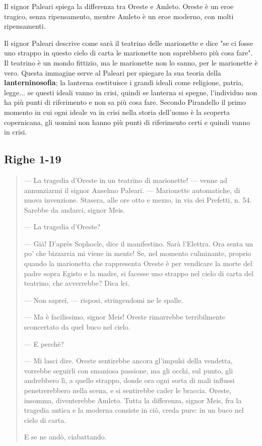 \documentclass[a4paper, twoside, titlepage]{book}
\newcounter{mar}
\begin{document}
Il signor Paleari spiega la differenza tra Oreste e Amleto. Oreste è un eroe tragico, senza ripensamento, mentre Amleto è un eroe moderno, con molti ripensamenti.

Il signor Paleari descrive come sarà il teatrino delle marionette e dice "se ci fosse uno strappo in questo cielo di carta le marionette non saprebbero più cosa fare". Il teatrino è un mondo fittizio,  ma le marionette non lo sanno, per le marionette è vero.
Questa immagine serve al Paleari per spiegare la sua teoria della \textbf{lanterninosofia}; la lanterna costituisce i grandi ideali come religione, patria, legge... se questi ideali vanno in crisi, quindi se lanterna si spegne, l'individuo non ha più punti di riferimento e non sa più cosa fare.
Secondo Pirandello il primo momento in cui ogni ideale va in crisi nella storia dell'uomo è la scoperta copernicana, gli uomini non hanno più punti di riferimento certi e quindi vanno in crisi.

\subsection*{Righe 1-19}

\begin{quotation}
— La tragedia d’Oreste in un teatrino di marionette! — venne ad annunziarmi il signor Anselmo Paleari. — Marionette automatiche, di nuova invenzione. Stasera, alle ore otto e mezzo, in via dei Prefetti, n. 54. Sarebbe da andarci, signor Meis.

— La tragedia d’Oreste?

— Già! D’après Sophocle, dice il manifestino. Sarà l’Elettra. Ora senta un po’ che bizzarria mi viene in mente! Se, nel momento culminante, proprio quando la marionetta che rappresenta Oreste è per vendicare la morte del padre sopra Egisto e la madre, si facesse uno strappo nel cielo di carta del teatrino, che avverrebbe? Dica lei.

— Non saprei, — risposi, stringendomi ne le spalle.

— Ma è facilissimo, signor Meis! Oreste rimarrebbe terribilmente sconcertato da quel buco nel cielo.

— E perchè?

— Mi lasci dire. Oreste sentirebbe ancora gl’impulsi della vendetta, vorrebbe seguirli con smaniosa passione, ma gli occhi, sul punto, gli andrebbero lì, a quello strappo, donde ora ogni sorta di mali influssi penetrerebbero nella scena, e si sentirebbe cader le braccia. Oreste, insomma, diventerebbe Amleto. Tutta la differenza, signor Meis, fra la tragedia antica e la moderna consiste in ciò, creda pure: in un buco nel cielo di carta.

E se ne andò, ciabattando.
\end{quotation}
\end{document}
